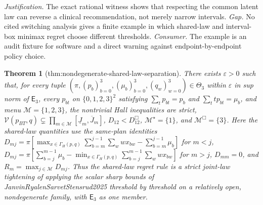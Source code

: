\documentclass{article}
\newtheorem{theorem}{Theorem}
\begin{document}
\par\smallskip\noindent \textit{Justification.} The exact rational witness shows that respecting the common latent law can reverse a clinical recommendation, not merely narrow intervals. \textit{Gap.} No cited switching analysis gives a finite example in which shared-law and interval-box minimax regret choose different thresholds. \textit{Consumer.} The example is an audit fixture for software and a direct warning against endpoint-by-endpoint policy choice.

\begin{theorem}[thm:nondegenerate-shared-law-separation]\label{thm:nondegenerate-shared-law-separation}
There exists \(\varepsilon>0\) such that, for every tuple \((\pi,(p_b)_{b=0}^{3},(\mu_b)_{b=0}^{3},(q_w)_{w=0}^{3})\in\Theta_3\) within \(\varepsilon\) in sup norm of \(\mathsf E_3\), every \(p_{bt}\) on \(\{0,1,2,3\}^2\) satisfying \(\sum_t p_{bt}=p_b\) and \(\sum_t t p_{bt}=\mu_b\), and menu \(\mathcal M=\{1,2,3\}\), the nontrivial Hall inequalities are strict, \(\mathcal V(p_{BT},q)\subsetneq\prod_{m\in\mathcal M}[\underline J_m,\overline J_m]\), \(D_{12}<D^{\Box}_{12}\), \(\mathcal M^\star=\{1\}\), and \(\mathcal M^{\Box}=\{3\}\). Here the shared-law quantities use the same-plan identities \(D_{mj}=\pi[\max_{x\in\Gamma_H(p,q)}\sum_{b=m}^{j-1}\sum_w w x_{bw}-\sum_{b=m}^{j-1}\mu_b]\) for \(m<j\), \(D_{mj}=\pi[\sum_{b=j}^{m-1}\mu_b-\min_{x\in\Gamma_H(p,q)}\sum_{b=j}^{m-1}\sum_w w x_{bw}]\) for \(m>j\), \(D_{mm}=0\), and \(R_m=\max_{j\in\mathcal M}D_{mj}\). Thus the shared-law regret rule is a strict joint-law tightening of applying the scalar sharp bounds of JanvinRyalenSarvetStensrud2025 threshold by threshold on a relatively open, nondegenerate family, with \(\mathsf E_3\) as one member.
\end{theorem}
\end{document}
